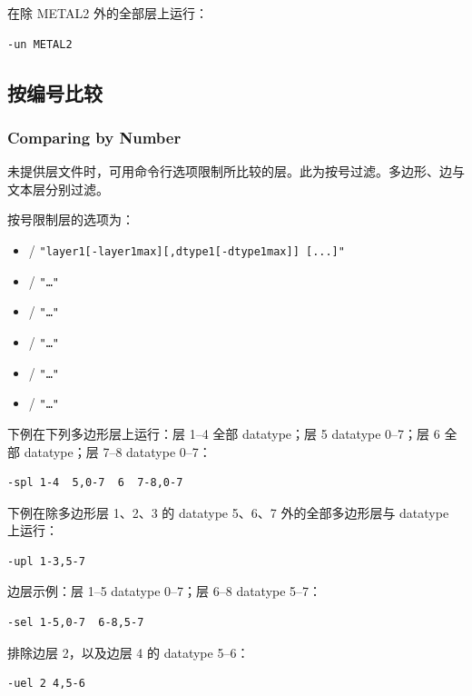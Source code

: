 在除 METAL2 外的全部层上运行：
\begin{lstlisting}
-un METAL2
\end{lstlisting}

\subsection{按编号比较}
\subsubsection*{Comparing by Number}

未提供层文件时，可用命令行选项限制所比较的层。此为按号过滤。多边形、边与文本层分别过滤。

按号限制层的选项为：
\begin{itemize}
  \item {}/ \texttt{"layer1[-layer1max][,dtype1[-dtype1max]] [...]"}
  \item {}/ \texttt{"\ldots"}
  \item {}/ \texttt{"\ldots"}
  \item {}/ \texttt{"\ldots"}
  \item {}/ \texttt{"\ldots"}
  \item {}/ \texttt{"\ldots"}
\end{itemize}

下例在下列多边形层上运行：层 1--4 全部 datatype；层 5 datatype 0--7；层 6 全部 datatype；层 7--8 datatype 0--7：
\begin{lstlisting}
-spl 1-4  5,0-7  6  7-8,0-7
\end{lstlisting}

下例在除多边形层 1、2、3 的 datatype 5、6、7 外的全部多边形层与 datatype 上运行：
\begin{lstlisting}
-upl 1-3,5-7
\end{lstlisting}

边层示例：层 1--5 datatype 0--7；层 6--8 datatype 5--7：
\begin{lstlisting}
-sel 1-5,0-7  6-8,5-7
\end{lstlisting}

排除边层 2，以及边层 4 的 datatype 5--6：
\begin{lstlisting}
-uel 2 4,5-6
\end{lstlisting}

